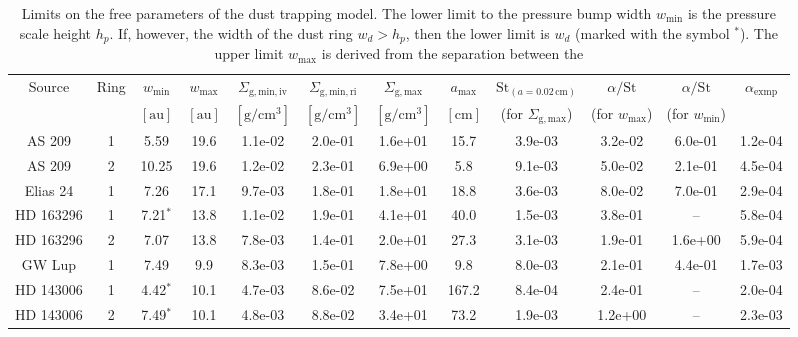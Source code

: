 \documentclass{aa}
\begin{document}
\begin{table*}
\begin{center}
\begin{tabular}{|cc|ccccccc|ccc|}
\hline
\hline
Source     & Ring & $w_{\mathrm{min}}$ & $w_{\mathrm{max}}$ & $\Sigma_{\mathrm{g,min,iv}}$ & $\Sigma_{\mathrm{g,min,ri}}$ & $\Sigma_{\mathrm{g,max}}$ & $a_{\mathrm{max}}$ & $\mathrm{St}_{(a=0.02\,\mathrm{cm})}$ & $\alpha/\mathrm{St}$ & $\alpha/\mathrm{St}$ & $\alpha_{\mathrm{exmp}}$\\
           &      & $[\mathrm{au}]$  & $[\mathrm{au}]$  & $[\mathrm{g}/\mathrm{cm}^3]$ & $[\mathrm{g}/\mathrm{cm}^3]$ & $[\mathrm{g}/\mathrm{cm}^3]$ & $[\mathrm{cm}]$ & (for $\Sigma_{\mathrm{g,max}}$)& (for $w_\mathrm{max}$) & (for $w_\mathrm{min}$) &   \\
\hline
AS 209     & 1 &  5.59 & 19.6 & 1.1e-02 & 2.0e-01 & 1.6e+01 & 15.7 & 3.9e-03 & 3.2e-02 & 6.0e-01 & 1.2e-04\\
AS 209     & 2 & 10.25 & 19.6 & 1.2e-02 & 2.3e-01 & 6.9e+00 &  5.8 & 9.1e-03 & 5.0e-02 & 2.1e-01 & 4.5e-04\\
Elias 24   & 1 &  7.26 & 17.1 & 9.7e-03 & 1.8e-01 & 1.8e+01 & 18.8 & 3.6e-03 & 8.0e-02 & 7.0e-01 & 2.9e-04\\
HD 163296  & 1 &  7.21$^{*}$ & 13.8 & 1.1e-02 & 1.9e-01 & 4.1e+01 & 40.0 & 1.5e-03 & 3.8e-01 & -- & 5.8e-04\\
HD 163296  & 2 &  7.07 & 13.8 & 7.8e-03 & 1.4e-01 & 2.0e+01 & 27.3 & 3.1e-03 & 1.9e-01 & 1.6e+00 & 5.9e-04\\
GW Lup     & 1 &  7.49 &  9.9 & 8.3e-03 & 1.5e-01 & 7.8e+00 &  9.8 & 8.0e-03 & 2.1e-01 & 4.4e-01 & 1.7e-03\\
HD 143006  & 1 &  4.42$^{*}$ & 10.1 & 4.7e-03 & 8.6e-02 & 7.5e+01 & 167.2 & 8.4e-04 & 2.4e-01 & -- & 2.0e-04\\
HD 143006  & 2 &  7.49$^{*}$ & 10.1 & 4.8e-03 & 8.8e-02 & 3.4e+01 & 73.2 & 1.9e-03 & 1.2e+00 & -- & 2.3e-03\\
\hline
\hline
\end{tabular}
\end{center}
\caption{\label{tab-ring-model-limits}Limits on the free parameters of the dust
  trapping model. The lower limit to the pressure bump width $w_{\mathrm{min}}$
  is the pressure scale height $h_p$. If, however, the width of the dust ring
  $w_d>h_p$, then the lower limit is $w_d$ (marked with the symbol $^{*}$).  The
  upper limit $w_{\mathrm{max}}$ is derived from the separation between the
}
\end{table*}
\end{document}
